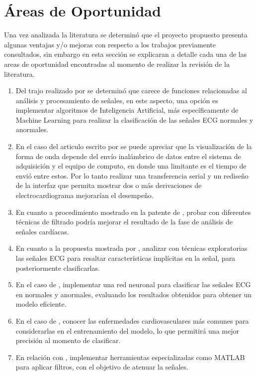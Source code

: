 \section{Áreas de Oportunidad}

Una vez analizada la literatura se determinó que el proyecto propuesto presenta algunas ventajas y/o mejoras con respecto a los trabajos previamente consultados, sin embargo en esta sección se explicaran a detalle cada una de las areas de oportunidad encontradas al momento de realizar la revisión de la literatura. 

\begin{enumerate}
    \item Del trajo realizado por \citep{bib1} se determinó que carece de funciones relacionadas al análisis y procesamiento de señales, en este aspecto, una opción es implementar algoritmos de Inteligencia Artificial, más específicamente de Machine Learning para realizar la clasificación de las señales ECG normales y anormales.
    \item En el caso del articulo escrito por \citep{bib2} se puede apreciar que la visualización de la forma de onda depende del envío inalámbrico de datos entre el sistema de adquisición y el equipo de computo, en donde una limitante es el tiempo de envió entre estos. Por lo tanto realizar una transferencia serial y un rediseño de la interfaz que permita mostrar dos o más derivaciones de electrocardiograma mejorarían el desempeño.
    \item En cuanto a procedimiento mostrado en la patente de \citep{bib3}, probar con diferentes técnicas de filtrado podría mejorar el resultado de la fase de análisis de señales cardíacas.
    \item En cuanto a la propuesta mostrada por \citep{bib5}, analizar con técnicas exploratorias las señales ECG para resaltar características implícitas en la señal, para posteriormente clasificarlas.
    \item  En el caso de \citep{bib6}, implementar una red neuronal para clasificar las señales ECG en normales y anormales, evaluando los resultados obtenidos para obtener un modelo eficiente.
    \item En el caso de \citep{bib7}, conocer las enfermedades cardiovasculares más comunes para considerarlas en el entrenamiento del modelo, lo que permitirá una mejor precisión al momento de clasificar.
    \item En relación con \citep{bib8}, implementar herramientas especializadas como MATLAB para aplicar filtros, con el objetivo de atenuar la señales.

\end{enumerate}
